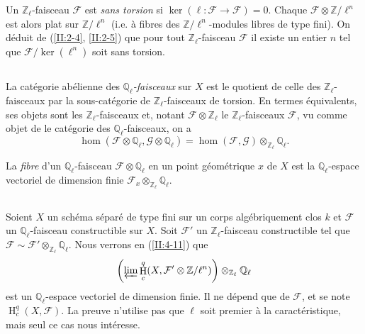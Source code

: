 \documentclass{book}
\DeclareMathOperator{\h}{H}
\newcommand{\cF}{\mathcal{F}}
\newcommand{\cG}{\mathcal{G}}
\newcommand{\dQ}{\mathbb{Q}}
\newcommand{\dZ}{\mathbb{Z}}
\begin{document}
Un $\dZ_\ell$-faisceau $\cF$ est \emph{sans torsion} si 
$\ker(\ell:\cF\to\cF) = 0$. Chaque $\cF\otimes\dZ/\ell^n$ est alors plat sur 
$\dZ/\ell^n$ (i.e. à fibres des $\dZ/\ell^n$-modules libres de type fini). On 
déduit de (\ref{II:2-4}, \ref{II:2-5}) que pour tout $\dZ_\ell$-faisceau 
$\cF$ il existe un entier $n$ tel que $\cF/\ker(\ell^n)$ soit sans torsion. 





\subsection{}\label{II:2-9}

La catégorie abélienne des \emph{$\dQ_\ell$-faisceaux} sur $X$ est le 
quotient de celle des $\dZ_\ell$-faisceaux par la sous-catégorie de 
$\dZ_\ell$-faisceaux de torsion. En termes équivalents, ses objets sont les 
$\dZ_\ell$-faisceaux et, notant $\cF\otimes\dZ_\ell$ le $\dZ_\ell$-faisceaux 
$\cF$, vu comme objet de le catégorie des $\dQ_\ell$-faisceaux, on a 
\[
  \hom(\cF\otimes\dQ_\ell,\cG\otimes\dQ_\ell) = \hom(\cF,\cG)\otimes_{\dZ_\ell}\dQ_\ell \text{.}
\]

La \emph{fibre} d'un $\dQ_\ell$-faisceau $\cF\otimes\dQ_\ell$ en un point 
géométrique $x$ de $X$ est la $\dQ_\ell$-espace vectoriel de dimension 
finie $\cF_x\otimes_{\dZ_\ell}\dQ_\ell$. 





\subsection{}\label{II:2-10}

Soient $X$ un schéma séparé de type fini sur un corps algébriquement 
clos $k$ et $\cF$ un $\dQ_\ell$-faisceau constructible sur $X$. Soit $\cF'$ un 
$\dZ_\ell$-faisceau constructible tel que 
$\cF\sim \cF'\otimes_{\dZ_\ell}\dQ_\ell$. Nous verrons en (\ref{II:4-11}) que 
\[
  \left(\varprojlim \h_c^q(X,\cF'\otimes \dZ/\ell^n)\right)\otimes_{\dZ_\ell}\dQ_\ell
\]
est un $\dQ_\ell$-espace vectoriel de dimension finie. Il ne dépend que de 
$\cF$, et se note $\h_c^q(X,\cF)$. La preuve n'utilise pas que $\ell$ soit 
premier à la caractéristique, mais seul ce cas nous intéresse. 





\subsection{}\label{II:2-11}
\end{document}
